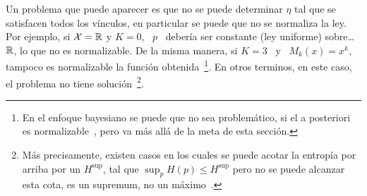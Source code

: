 Un problema que puede  aparecer es que no se puede determinar  $\eta$ tal que se
satisfacen todos los  v\'inculos, en particular se puede que  no se normaliza la
ley.  Por ejemplo,  si $\mathcal{X} = \mathbb{R}$ y  $K = 0$, \ $p$ \  deber\'ia ser constante
(ley  uniforme) sobre\ldots  $\mathbb{R}$, lo  que no  es normalizable.  De  la misma
manera, si $K  = 3$ \ y \  $M_k(x) = x^k$, tampoco es  normalizable la funci\'on
obtenida~\footnote{En el  enfoque bayesiano se puede que  no sea problem\'atico,
  si el  a posteriori es normalizable~\cite{Rob07},  pero va m\'as  all\'a de la
  meta de  esta secci\'on.}.  En  otros terminos, en  este caso, el  problema no
tiene soluci\'on~\footnote{M\'as  precisamente, existen  casos en los  cuales se
  puede acotar la entrop\'ia por arriba  por un $H^{\sup}$, tal que $\sup_p H(p)
  \le H^{\sup}$ pero no  se puede alcanzar esta cota, \ie es  un supremum, no un
  m\'aximo~\cite[sec.~12.3]{CovTho06}.}.

